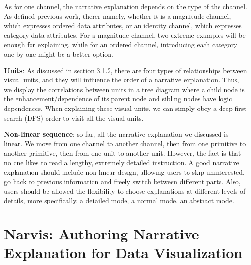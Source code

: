 \documentclass[review,journal]{vgtc}         %
\begin{document}
As for one channel, the narrative explanation depends on the type of the channel. As defined previous work, therer namely, whether it is a magnitude channel, which expresses ordered data attributes, or an identity channel, which expresses category data attributes. For a magnitude channel, two extreme examples will be enough for explaining, while for an ordered channel, introducing each category one by one might be a better option.\par
\textbf{Units}: As discussed in section 3.1.2, there are four types of relationships between visual units, and they will influence the order of a narrative explanation. Thus, we display the correlations between units in a tree diagram where a child node is the enhancement/dependence of its parent node and sibling nodes have logic dependences. When explaining these visual units, we can simply obey a deep first search (DFS) order to visit all the visual units.\par
\textbf{Non-linear sequence}: so far, all the narrative explanation we discussed is linear. We move from one channel to another channel, then from one primitive to another primitive, then from one unit to another unit. However, the fact is that no one likes to read a lengthy, extremely detailed instruction. A good narrative explanation should include non-linear design, allowing users to skip uninterested, go back to previous information and freely switch between different parts. Also, users should be allowed the flexibility to choose explanations at different levels of details, more specifically, a detailed mode, a normal mode, an abstract mode. \par
\section{Narvis: Authoring Narrative Explanation for Data Visualization}
\end{document}
